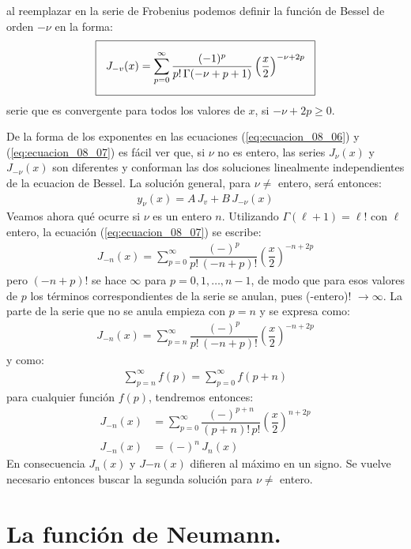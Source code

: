 al reemplazar en la serie de Frobenius podemos definir la función de Bessel de orden $-\nu$ en la forma:
\begin{align}
\setlength{\fboxsep}{3\fboxsep}\boxed{
J_{-v} (x) = \sum_{p=0}^{\infty} \dfrac{(-1)^{p}}{p! \, \Gamma (-\nu + p + 1)} \left( \dfrac{x}{2} \right)^{-\nu+2p}}
\label{eq:ecuacion_08_07}
\end{align}
serie que es convergente para todos los valores de $x$, si $-\nu + 2p \geq 0$.
\par
De la forma de los exponentes en las ecuaciones (\ref{eq:ecuacion_08_06}) y (\ref{eq:ecuacion_08_07}) es fácil ver que, si $\nu$ no es entero, las series $J_{\nu}(x)$ y $J_{-\nu}(x)$ son diferentes y conforman las dos soluciones linealmente independientes de la ecuacion de Bessel. La solución general, para $\nu \neq$ entero, será entonces:
\begin{align*}
y_{\nu}(x) = A \, J_{v} + B \, J_{-\nu} (x)
\end{align*}
Veamos ahora qué ocurre si $\nu$ es un entero $n$. Utilizando $\Gamma (\ell + 1) = \ell !$ con $\ell$ entero, la ecuación (\ref{eq:ecuacion_08_07}) se escribe:
\begin{align*}
J_{-n} (x) = \sum_{p=0}^{\infty} \dfrac{(-)^{p}}{p! \, (-n + p)!} \left( \dfrac{x}{2} \right)^{-n+2p}
\end{align*}
pero $(-n + p)!$ se hace $\infty$ para $p = 0, 1, \ldots, n-1$, de modo que para esos valores de $p$ los términos correspondientes de la serie se anulan, pues (-entero)! $\to \infty$. La parte de la serie que no se anula empieza con $p = n$ y se expresa como:
\begin{align*}
J_{-n} (x) = \sum_{p=n}^{\infty} \dfrac{(-)^{p}}{p! \, (-n + p)!} \left( \dfrac{x}{2} \right)^{-n+2p}
\end{align*}
y como:
\begin{align*}
\sum_{p=n}^{\infty} f(p) = \sum_{p=0}^{\infty} f(p + n)
\end{align*}
para cualquier función $f(p)$, tendremos entonces:
\begin{align*}
J_{-n} (x) &= \sum_{p=0}^{\infty} \dfrac{(-)^{p+n}}{(p + n)! \, p!} \left( \dfrac{x}{2} \right)^{n+2p} \\[0.5em]
J_{-n} (x) &= (-)^{n} \, J_{n}(x)
\end{align*}
En consecuencia $J_{n}(x)$ y $J{-n}(x)$ difieren al máximo en un signo. Se vuelve necesario entonces buscar la segunda solución para $\nu \neq$ entero.

\section{La función de Neumann.}

